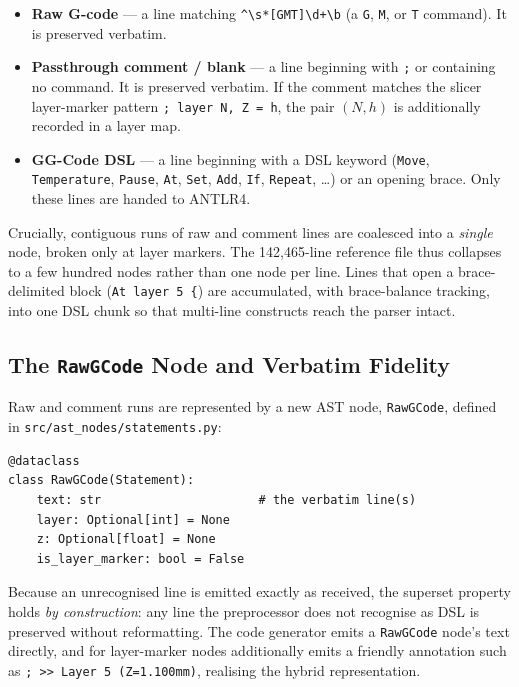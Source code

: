 \begin{itemize}
    \item[-] \textbf{Raw G-code} --- a line matching \verb|^\s*[GMT]\d+\b| (a \texttt{G}, \texttt{M}, or \texttt{T} command). It is preserved verbatim.
    \item[-] \textbf{Passthrough comment / blank} --- a line beginning with \texttt{;} or containing no command. It is preserved verbatim. If the comment matches the slicer layer-marker pattern \verb|; layer N, Z = h|, the pair $(N, h)$ is additionally recorded in a layer map.
    \item[-] \textbf{GG-Code DSL} --- a line beginning with a DSL keyword (\texttt{Move}, \texttt{Temperature}, \texttt{Pause}, \texttt{At}, \texttt{Set}, \texttt{Add}, \texttt{If}, \texttt{Repeat}, \ldots) or an opening brace. Only these lines are handed to ANTLR4.
\end{itemize}

Crucially, contiguous runs of raw and comment lines are coalesced into a \emph{single} node, broken only at layer markers. The 142{,}465-line reference file thus collapses to a few hundred nodes rather than one node per line. Lines that open a brace-delimited block (\texttt{At layer 5 \{}) are accumulated, with brace-balance tracking, into one DSL chunk so that multi-line constructs reach the parser intact.

\subsection*{The \texttt{RawGCode} Node and Verbatim Fidelity}

Raw and comment runs are represented by a new AST node, \texttt{RawGCode}, defined in \texttt{src/ast\_nodes/statements.py}:

\begin{verbatim}
@dataclass
class RawGCode(Statement):
    text: str                      # the verbatim line(s)
    layer: Optional[int] = None
    z: Optional[float] = None
    is_layer_marker: bool = False
\end{verbatim}

Because an unrecognised line is emitted exactly as received, the superset property holds \emph{by construction}: any line the preprocessor does not recognise as DSL is preserved without reformatting. The code generator emits a \texttt{RawGCode} node's text directly, and for layer-marker nodes additionally emits a friendly annotation such as \verb|; >> Layer 5 (Z=1.100mm)|, realising the hybrid representation.

